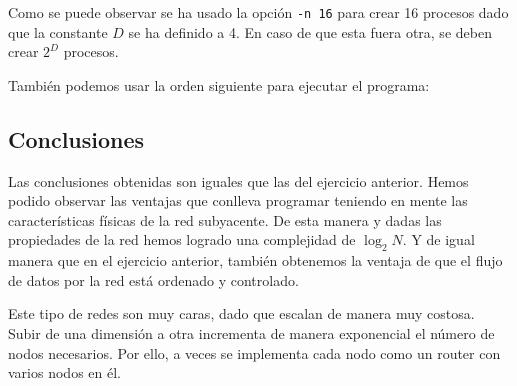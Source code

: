 \documentclass[11pt]{article}
\begin{document}
Como se puede observar se ha usado la opción \texttt{-n 16} para crear 16 procesos dado que la constante $D$ se ha definido a 4. En caso de que esta fuera otra, se deben crear $2^D$ procesos.

También podemos usar la orden siguiente para ejecutar el programa: 


\subsection{Conclusiones}
Las conclusiones obtenidas son iguales que las del ejercicio anterior. Hemos podido observar las ventajas que conlleva programar teniendo en mente las características físicas de la red subyacente. De esta manera y dadas las propiedades de la red hemos logrado una complejidad de $\log_2{N}$. Y de igual manera que en el ejercicio anterior, también obtenemos la ventaja de que el flujo de datos por la red está ordenado y controlado.

Este tipo de redes son muy caras, dado que escalan de manera muy costosa. Subir de una dimensión a otra incrementa de manera exponencial el número de nodos necesarios. Por ello, a veces se implementa cada nodo como un router con varios nodos en él.


\newpage
\nocite{*}  %


\end{document}
